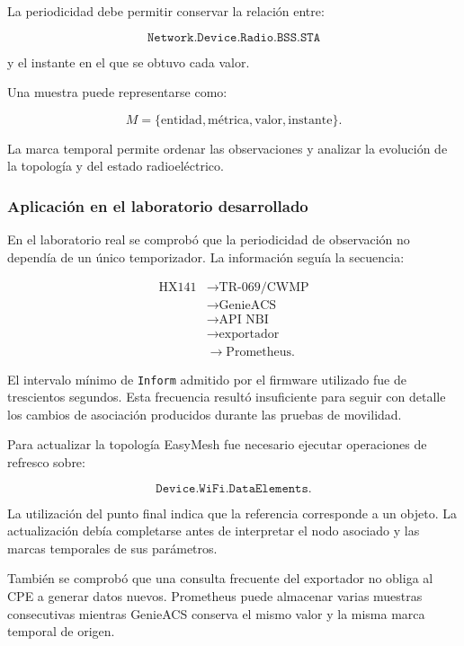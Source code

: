 La periodicidad debe permitir conservar la relación entre:

\[
    \texttt{Network.Device.Radio.BSS.STA}
\]

y el instante en el que se obtuvo cada valor.

Una muestra puede representarse como:

\[
    M
    =
    \{
        \text{entidad},
        \text{métrica},
        \text{valor},
        \text{instante}
    \}.
\]

La marca temporal permite ordenar las observaciones y analizar la
evolución de la topología y del estado radioeléctrico.


\subsubsection*{Aplicación en el laboratorio desarrollado}

En el laboratorio real se comprobó que la periodicidad de observación no
dependía de un único temporizador. La información seguía la secuencia:

\[
\begin{aligned}
    \text{HX141}
    &\longrightarrow
    \text{TR-069/CWMP}\\
    &\longrightarrow
    \text{GenieACS}\\
    &\longrightarrow
    \text{API NBI}\\
    &\longrightarrow
    \text{exportador}\\
    &\longrightarrow
    \text{Prometheus}.
\end{aligned}
\]

El intervalo mínimo de \texttt{Inform} admitido por el firmware utilizado
fue de trescientos segundos. Esta frecuencia resultó insuficiente para
seguir con detalle los cambios de asociación producidos durante las
pruebas de movilidad.

Para actualizar la topología EasyMesh fue necesario ejecutar operaciones
de refresco sobre:

\[
    \texttt{Device.WiFi.DataElements.}
\]

La utilización del punto final indica que la referencia corresponde a un
objeto. La actualización debía completarse antes de interpretar el nodo
asociado y las marcas temporales de sus parámetros.

También se comprobó que una consulta frecuente del exportador no obliga
al CPE a generar datos nuevos. Prometheus puede almacenar varias muestras
consecutivas mientras GenieACS conserva el mismo valor y la misma marca
temporal de origen.

